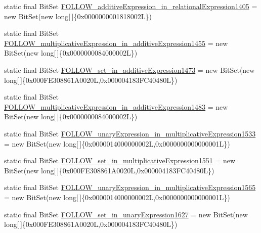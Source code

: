 \begin{DoxyCompactItemize}
\item 
static final Bit\-Set \hyperlink{classorg_1_1tzi_1_1use_1_1parser_1_1testsuite_1_1_test_suite_parser_a448c86ba075a26731ae3f161604fc939}{F\-O\-L\-L\-O\-W\-\_\-additive\-Expression\-\_\-in\-\_\-relational\-Expression1405} = new Bit\-Set(new long\mbox{[}$\,$\mbox{]}\{0x0000000001818002\-L\})
\item 
static final Bit\-Set \hyperlink{classorg_1_1tzi_1_1use_1_1parser_1_1testsuite_1_1_test_suite_parser_a26dd57f8372ceff0a60651c6a9f43931}{F\-O\-L\-L\-O\-W\-\_\-multiplicative\-Expression\-\_\-in\-\_\-additive\-Expression1455} = new Bit\-Set(new long\mbox{[}$\,$\mbox{]}\{0x0000000084000002\-L\})
\item 
static final Bit\-Set \hyperlink{classorg_1_1tzi_1_1use_1_1parser_1_1testsuite_1_1_test_suite_parser_a41eabad3e6f911130d601917e82f6118}{F\-O\-L\-L\-O\-W\-\_\-set\-\_\-in\-\_\-additive\-Expression1473} = new Bit\-Set(new long\mbox{[}$\,$\mbox{]}\{0x000\-F\-E308861\-A0020\-L,0x000004183\-F\-C40480\-L\})
\item 
static final Bit\-Set \hyperlink{classorg_1_1tzi_1_1use_1_1parser_1_1testsuite_1_1_test_suite_parser_a02fe20921180780f20e78526dfe7941c}{F\-O\-L\-L\-O\-W\-\_\-multiplicative\-Expression\-\_\-in\-\_\-additive\-Expression1483} = new Bit\-Set(new long\mbox{[}$\,$\mbox{]}\{0x0000000084000002\-L\})
\item 
static final Bit\-Set \hyperlink{classorg_1_1tzi_1_1use_1_1parser_1_1testsuite_1_1_test_suite_parser_ad6b90b074a9c4f75bf6f0658121e10e5}{F\-O\-L\-L\-O\-W\-\_\-unary\-Expression\-\_\-in\-\_\-multiplicative\-Expression1533} = new Bit\-Set(new long\mbox{[}$\,$\mbox{]}\{0x0000014000000002\-L,0x0000000000000001\-L\})
\item 
static final Bit\-Set \hyperlink{classorg_1_1tzi_1_1use_1_1parser_1_1testsuite_1_1_test_suite_parser_aa0ea7c0b838cf90cdb008f79ab3673b2}{F\-O\-L\-L\-O\-W\-\_\-set\-\_\-in\-\_\-multiplicative\-Expression1551} = new Bit\-Set(new long\mbox{[}$\,$\mbox{]}\{0x000\-F\-E308861\-A0020\-L,0x000004183\-F\-C40480\-L\})
\item 
static final Bit\-Set \hyperlink{classorg_1_1tzi_1_1use_1_1parser_1_1testsuite_1_1_test_suite_parser_a1237a06d80a83b46b40169a933b2ec92}{F\-O\-L\-L\-O\-W\-\_\-unary\-Expression\-\_\-in\-\_\-multiplicative\-Expression1565} = new Bit\-Set(new long\mbox{[}$\,$\mbox{]}\{0x0000014000000002\-L,0x0000000000000001\-L\})
\item 
static final Bit\-Set \hyperlink{classorg_1_1tzi_1_1use_1_1parser_1_1testsuite_1_1_test_suite_parser_abaf68c9904d9f99e9135933fd605ef11}{F\-O\-L\-L\-O\-W\-\_\-set\-\_\-in\-\_\-unary\-Expression1627} = new Bit\-Set(new long\mbox{[}$\,$\mbox{]}\{0x000\-F\-E308861\-A0020\-L,0x000004183\-F\-C40480\-L\})

\end{DoxyCompactItemize}
